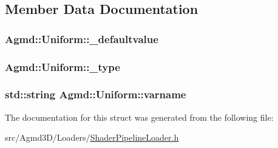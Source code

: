 \subsection{Member Data Documentation}
\hypertarget{struct_agmd_1_1_uniform_a4256fb764fb19c54f5591e928dce21e4}{
\subsubsection[{\+\_\+defaultvalue}]{ Agmd\+::\+Uniform\+::\+\_\+defaultvalue}}\label{struct_agmd_1_1_uniform_a4256fb764fb19c54f5591e928dce21e4}
\hypertarget{struct_agmd_1_1_uniform_ad4070c0c634a0e3ced8272165dc4a1d4}{
\subsubsection[{\+\_\+type}]{ Agmd\+::\+Uniform\+::\+\_\+type}}\label{struct_agmd_1_1_uniform_ad4070c0c634a0e3ced8272165dc4a1d4}
\hypertarget{struct_agmd_1_1_uniform_a279f442125b88f35673cf735f7795381}{
\subsubsection[{varname}]{\setlength{\rightskip}{0pt plus 5cm}std\+::string Agmd\+::\+Uniform\+::varname}}\label{struct_agmd_1_1_uniform_a279f442125b88f35673cf735f7795381}


The documentation for this struct was generated from the following file\+:\begin{DoxyCompactItemize}
\item 
src/\+Agmd3\+D/\+Loaders/\hyperlink{_shader_pipeline_loader_8h}{Shader\+Pipeline\+Loader.\+h}\end{DoxyCompactItemize}
